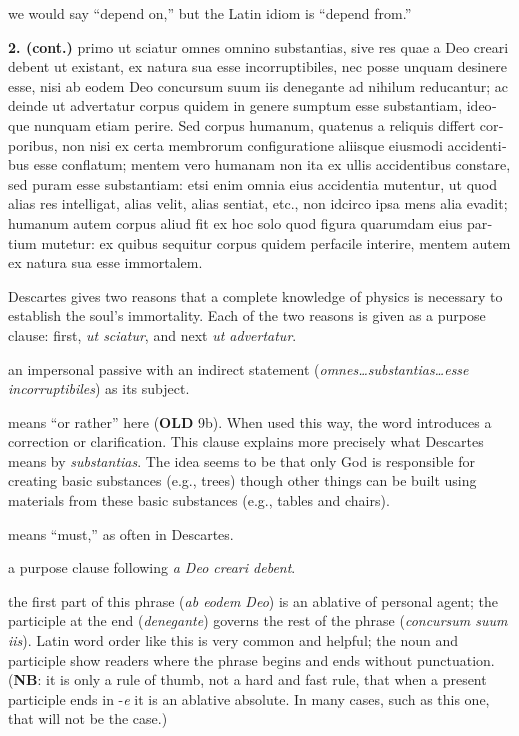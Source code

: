  we would say ``depend on,'' but the Latin idiom is ``depend from.''

\clearpage

\beginnumbering
\pstart
{}
\begin{latin}
    \textenglish{\textbf{2. (cont.)}}  primo  ut sciatur omnes omnino substantias, sive res quae a Deo creari debent ut existant, ex natura sua esse incorruptibiles, nec posse unquam desinere esse, nisi ab eodem Deo concursum suum iis denegante ad nihilum reducantur; ac deinde ut advertatur corpus quidem in genere sumptum esse substantiam, ideoque nunquam etiam perire. Sed corpus humanum, quatenus a reliquis differt corporibus, non nisi ex certa membrorum configuratione aliisque eiusmodi accidentibus esse conflatum; mentem vero humanam non ita ex ullis accidentibus constare, sed puram esse substantiam: etsi enim omnia eius accidentia mutentur, ut quod alias res intelligat, alias velit, alias sentiat, etc., non idcirco ipsa mens alia evadit; humanum autem corpus aliud fit ex hoc solo quod figura quarumdam eius partium mutetur: ex quibus sequitur corpus quidem perfacile interire, mentem autem ex natura sua esse immortalem.
\end{latin}
\pend
\endnumbering

\prenotes

 Descartes gives two reasons that a complete knowledge of physics is necessary to establish the soul's immortality. Each of the two reasons is given as a purpose clause: first, \textit{ut sciatur}, and next \textit{ut advertatur}.

 an impersonal passive with an indirect statement (\textit{omnes\dots substantias\dots esse incorruptibiles}) as its subject.

 means ``or rather'' here (\textbf{OLD} 9b). When used this way, the word introduces a correction or clarification. This clause explains more precisely what Descartes means by \textit{substantias}. The idea seems to be that only God is responsible for creating basic substances (e.g., trees) though other things can be built using materials from these basic substances (e.g., tables and chairs).

 means ``must,'' as often in Descartes.

 a purpose clause following \textit{a Deo creari debent}.

 the first part of this phrase (\textit{ab eodem Deo}) is an ablative of personal agent; the participle at the end (\textit{denegante}) governs the rest of the phrase (\textit{concursum suum iis}). Latin word order like this is very common and helpful; the noun and participle show readers where the phrase begins and ends without punctuation. (\textbf{NB}: it is only a rule of thumb, not a hard and fast rule, that when a present participle ends in -\textit{e} it is an ablative absolute. In many cases, such as this one, that will not be the case.)

